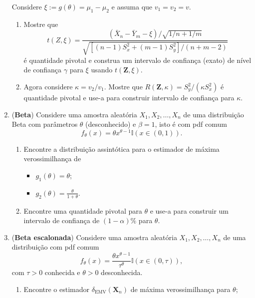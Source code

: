 \documentclass[a4paper,10pt, notitlepage]{report}
\newcommand{\rs}{X_1, X_2, \ldots, X_n} %
\newcommand{\bX}{\boldsymbol{X}} %
\begin{document}
\begin{enumerate}
Considere $\xi :=  g(\theta) = \mu_1 - \mu_2$ e assuma que $v_1 = v_2 = v$.
\begin{enumerate}
    \item Mostre que 
    \begin{equation*}
        t(Z, \xi) = \frac{(\bar{X}_n - \bar{Y}_m - \xi)/\sqrt{1/n + 1/m}}{\sqrt{\left[(n-1)S_x^2 + (m-1)S_y^2\right]/(n + m -2)}}
    \end{equation*}
    é quantidade pivotal e construa um intervalo de confiança (exato) de nível de confiança $\gamma$ para $\xi$ usando $t(\boldsymbol{Z}, \xi)$.
    \item Agora considere $\kappa = v_2/v_1$. 
    Mostre que $R(\boldsymbol{Z}, \kappa) = S_y^2/(\kappa S_x^2)$ é quantidade pivotal e use-a para construir intervalo de confiança para $\kappa$.
\end{enumerate}
 \item (\textbf{Beta}) 
 Considere uma amostra aleatória $\rs$  de uma distribuição Beta com parâmetros $\theta$ (desconhecido) e $\beta = 1$, isto é com pdf comum
 \begin{equation*}
     f_\theta(x) = \theta x^{\theta-1}\mathbb{I}(x \in (0, 1)).
 \end{equation*}
 \begin{enumerate}
     \item Encontre a distribuição assintótica para o estimador de máxima verossimilhança de
      \begin{itemize}
          \item $g_1(\theta) = \theta$;
          \item $g_2(\theta) = \frac{\theta}{1+\theta}$.
      \end{itemize}
     \item Encontre uma quantidade pivotal  para $\theta$ e use-a para construir um intervalo de confiança de $(1-\alpha)\%$ para $\theta$.
 \end{enumerate}
  \item (\textbf{Beta escalonada})
  Considere uma amostra aleatória $\rs$  de uma distribuição com pdf comum
   \begin{equation*}
     f_\theta(x) = \frac{\theta x^{\theta-1}}{\tau^\theta}\mathbb{I}(x \in (0, \tau)),
 \end{equation*}
 com $\tau >0$ conhecida e $\theta > 0$ desconhecida.
 \begin{enumerate}
     \item Encontre o estimador $\delta_{\text{EMV}}(\bX_n)$ de máxima verossimilhança para $\theta$;

\end{enumerate}
\end{enumerate}
\end{document}

